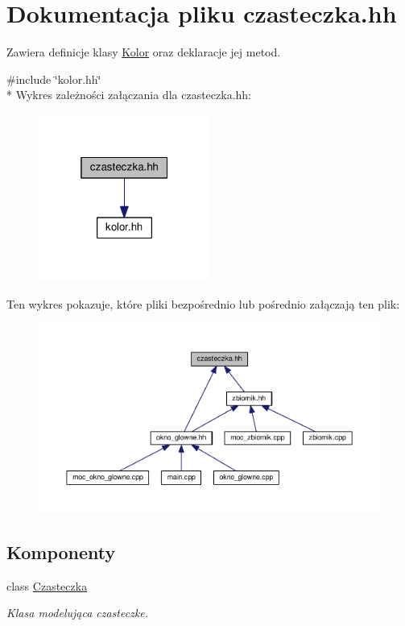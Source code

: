 \hypertarget{czasteczka_8hh}{\section{Dokumentacja pliku czasteczka.\-hh}
\label{czasteczka_8hh}
}


Zawiera definicje klasy \hyperlink{class_kolor}{Kolor} oraz deklaracje jej metod.  


{\ttfamily \#include \char`\"{}kolor.\-hh\char`\"{}}\\*
Wykres zależności załączania dla czasteczka.\-hh\-:\nopagebreak
\begin{figure}[H]
\begin{center}
\leavevmode
\includegraphics[width=160pt]{czasteczka_8hh__incl}
\end{center}
\end{figure}
Ten wykres pokazuje, które pliki bezpośrednio lub pośrednio załączają ten plik\-:
\nopagebreak
\begin{figure}[H]
\begin{center}
\leavevmode
\includegraphics[width=350pt]{czasteczka_8hh__dep__incl}
\end{center}
\end{figure}
\subsection*{Komponenty}
\begin{DoxyCompactItemize}
\item 
class \hyperlink{class_czasteczka}{Czasteczka}
\begin{DoxyCompactList}\small\item\em Klasa modelująca czasteczke. \end{DoxyCompactList}\end{DoxyCompactItemize}
